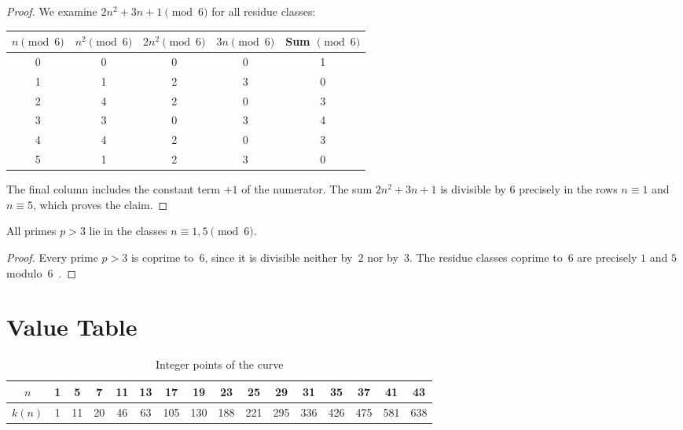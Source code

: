 \begin{proof}
We examine $2n^2 + 3n + 1 \pmod{6}$ for all residue classes:

\begin{center}
\begin{tabular}{ccccc}
\toprule
$n \pmod{6}$ & $n^2 \pmod{6}$ & $2n^2 \pmod{6}$ & $3n \pmod{6}$ & Sum $\pmod{6}$ \\
\midrule
0 & 0 & 0 & 0 & 1 \\
1 & 1 & 2 & 3 & 0 \\
2 & 4 & 2 & 0 & 3 \\
3 & 3 & 0 & 3 & 4 \\
4 & 4 & 2 & 0 & 3 \\
5 & 1 & 2 & 3 & 0 \\
\bottomrule
\end{tabular}
\end{center}
The final column includes the constant term $+1$ of the numerator.
The sum $2n^2 + 3n + 1$ is divisible by $6$ precisely in the rows
$n \equiv 1$ and $n \equiv 5$, which proves the claim.
\end{proof}

\begin{theorem}\label{satz:primzahlen}
All primes $p > 3$ lie in the classes $n \equiv 1, 5 \pmod{6}$.
\end{theorem}

\begin{proof}
Every prime $p > 3$ is coprime to~$6$, since it is divisible neither by~$2$
nor by~$3$. The residue classes coprime to~$6$ are precisely
$1$ and $5$ modulo~$6$~\cite[Ch.\,1]{IrelandRosen1990}.
\end{proof}

\section{Value Table}

\begin{table}[htbp]
\centering
\caption{Integer points of the curve}
\begin{tabular}{*{16}{c}}
\toprule
$n$ & 1 & 5 & 7 & 11 & 13 & 17 & 19 & 23 & 25 & 29 & 31 & 35 & 37 & 41 & 43 \\
\midrule
$k(n)$ & 1 & 11 & 20 & 46 & 63 & 105 & 130 & 188 & 221 & 295 & 336 & 426 & 475 & 581 & 638 \\
\bottomrule
\end{tabular}
\end{table}

